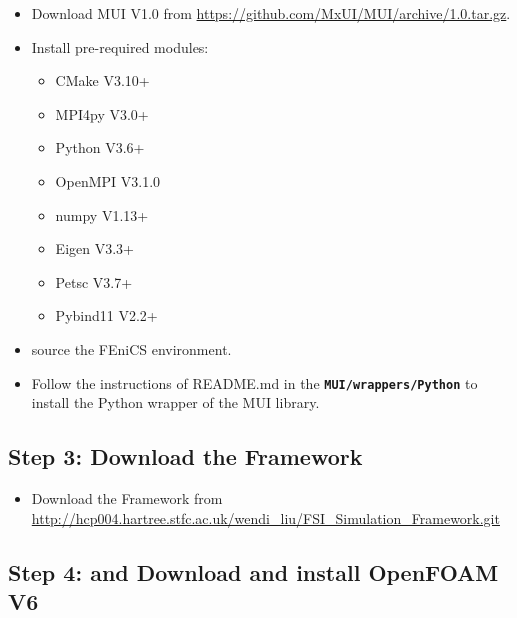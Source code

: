 \documentclass[a4paper, 12pt]{article}
\newcommand{\dir}[1]{{\textbf{\color{blue}\texttt{#1}}}}
\begin{document}
\begin{itemize}
	\item Download MUI V1.0 from \url{https://github.com/MxUI/MUI/archive/1.0.tar.gz}.
	\item Install pre-required modules:
	\begin{itemize}
		\item CMake V3.10+
		\item MPI4py V3.0+
		\item Python V3.6+
		\item OpenMPI V3.1.0
		\item numpy V1.13+
		\item Eigen V3.3+		
		\item Petsc V3.7+
		\item Pybind11 V2.2+			
	\end{itemize}
	\item source the FEniCS environment.
	\item Follow the instructions of README.md in the \dir{MUI/wrappers/Python} to install the Python wrapper of the MUI library.	
\end{itemize}

\subsection{Step 3: Download the Framework}

\begin{itemize}
	\item Download the Framework from \url{http://hcp004.hartree.stfc.ac.uk/wendi\_liu/FSI\_Simulation\_Framework.git}
\end{itemize}

\subsection{Step 4: and Download and install OpenFOAM V6}
	
\end{document}
